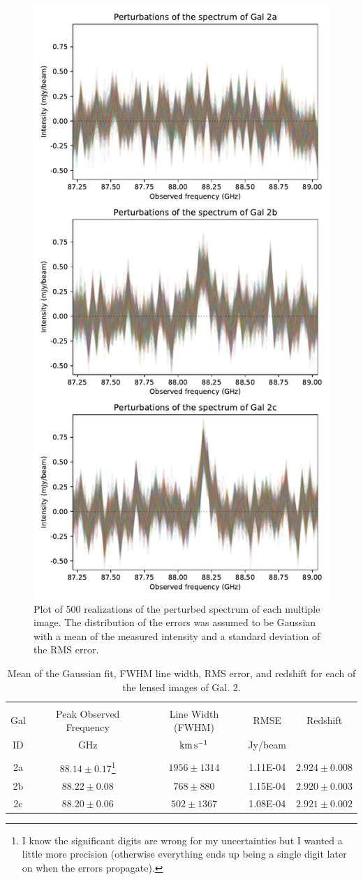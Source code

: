 \documentclass[11pt]{article}
\begin{document}
\begin{figure}[!htbp]
    \centering
    \includegraphics[width=0.6\linewidth]{../figs/perturbations.pdf}
	\caption{Plot of 500 realizations of the perturbed spectrum of each multiple image. The distribution of the errors was assumed to be Gaussian with a mean of the measured intensity and a standard deviation of the RMS error.}
	\label{fig:perturbations}
\end{figure}


\begin{table}[!htbp]
\begin{minipage}{\textwidth}
\centering
\begin{tabular}{ccccc}
\hline \\[-0.25cm]
Gal & Peak Observed Frequency & Line Width (FWHM)  & RMSE    & Redshift \\
ID  & GHz                     & ${\rm km\,s^{-1}}$ & Jy/beam & \\[0.1cm]
\hline \\[-0.25cm]
2a & $88.14 \pm 0.17$\footnote{I know the significant digits are wrong for my uncertainties but I wanted a little more precision (otherwise everything ends up being a single digit later on when the errors propagate).} & $1956 \pm 1314$ & 1.11E-04 & $2.924 \pm 0.008$  \\
2b & $88.22 \pm 0.08$ & $768 \pm 880$  & 1.15E-04 & $2.920 \pm 0.003$\\
2c & $88.20 \pm 0.06$ & $502 \pm 1367$ & 1.08E-04 & $2.921 \pm 0.002$\\
\hline
\end{tabular}
\caption{Mean of the Gaussian fit, FWHM line width, RMS error, and redshift for each of the lensed images of Gal. 2.}
\label{table:peaks_zs}
\end{minipage}
\end{table}
\end{document}
